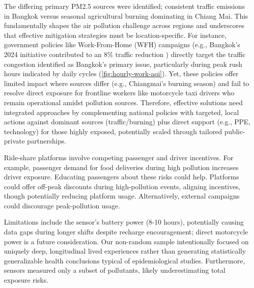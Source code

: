 The differing primary PM2.5 sources were identified; consistent traffic emissions in Bangkok versus seasonal agricultural burning dominating in Chiang Mai. 
This fundamentally shapes the air pollution challenge across regions and underscores that effective mitigation strategies must be location-specific. 
For instance, government policies like Work-From-Home (WFH) campaigns (e.g., Bangkok's 2024 initiative contributed to an 8\% traffic reduction  \cite{Wipatayotin_2025}) directly target the traffic congestion identified as Bangkok's primary issue, particularly during peak rush hours indicated by daily cycles (\autoref{fig:hourly-work-aqi}). 
Yet, these policies offer limited impact where sources differ (e.g., Chiangmai's burning season) and fail to resolve direct exposure for frontline workers like motorcycle taxi drivers who remain operational amidst pollution sources.
Therefore, effective solutions need integrated approaches by complementing national policies with targeted, local actions against dominant sources (traffic/burning) plus direct support (e.g., PPE, technology) for those highly exposed, potentially scaled through tailored public-private partnerships.






Ride-share platforms involve competing passenger and driver incentives.
For example, passenger demand for food deliveries during high pollution increases driver exposure.
Educating passengers about these risks could help.
Platforms could offer off-peak discounts during high-pollution events, aligning incentives, though potentially reducing platform usage.
Alternatively, external campaigns could discourage peak-pollution usage.








Limitations include the sensor's battery power (8-10 hours), potentially causing data gaps during longer shifts despite recharge encouragement; direct motorcycle power is a future consideration.
Our non-random sample intentionally focused on uniquely deep, longitudinal lived experiences rather than generating statistically generalizable health conclusions typical of epidemiological studies.
Furthermore, sensors measured only a subset of pollutants, likely underestimating total exposure risks.
